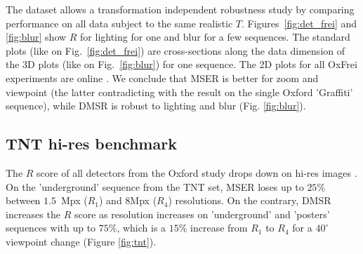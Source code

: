 \documentclass[conference,compsoc]{IEEEtran}
\begin{document}
The dataset allows a transformation independent robustness study by comparing performance on all data subject to the same realistic $T$. Figures~\ref{fig:det_frei} and \ref{fig:blur} show $R$ for lighting for one and blur for a few sequences. The standard plots (like on Fig.~\ref{fig:det_frei}) are cross-sections along the data dimension of the 3D plots (like on Fig.~\ref{fig:blur}) for one sequence. The 2D plots for all OxFrei experiments are online \cite{elena_ranguelova_2016_45156}. We conclude that MSER is better for zoom and viewpoint (the latter contradicting with the result on the single Oxford 'Graffiti' sequence), while DMSR is robust to lighting and blur (Fig. \ref{fig:blur}).

\subsection{TNT hi-res benchmark}
\label{ssec:tnt}

The $R$ score of all detectors from the Oxford study drops down on hi-res images \cite{CorRos2013}. On the 'underground' sequence from the TNT set, MSER loses up to $25\%$ between $1.5$~Mpx ($R_1$) and $8$Mpx ($R_4$) resolutions. On the contrary, DMSR increases the $R$ score as resolution increases on 'underground' and 'posters' sequences with up to $75\%$, which is a $15\%$ increase from $R_1$ to $R_4$ for a $40^{\circ}$ viewpoint change (Figure \ref{fig:tnt}). 
\end{document}
